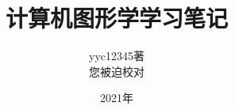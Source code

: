 \documentclass[10pt, a4paper, oneside]{ctexart}
\begin{document}
\title{计算机图形学学习笔记}
\author{yyc12345著\\您被迫校对}
\date{2021年}
\maketitle
\newpage
 
\tableofcontents
\newpage



\newpage
\end{document}
